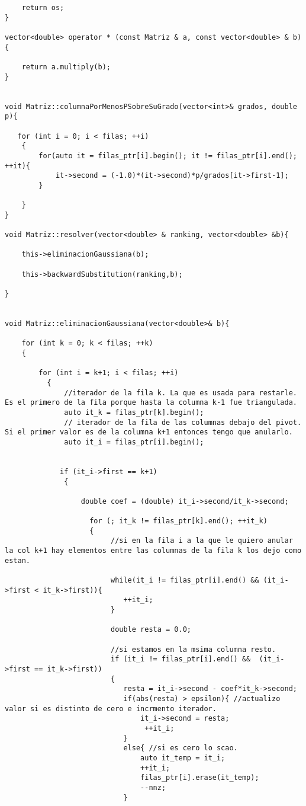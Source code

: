 \begin{lstlisting}
    return os;
}

vector<double> operator * (const Matriz & a, const vector<double> & b) {

    return a.multiply(b);
}


void Matriz::columnaPorMenosPSobreSuGrado(vector<int>& grados, double p){

   for (int i = 0; i < filas; ++i)
    {   
        for(auto it = filas_ptr[i].begin(); it != filas_ptr[i].end(); ++it){
            it->second = (-1.0)*(it->second)*p/grados[it->first-1];
        }

    }
}

void Matriz::resolver(vector<double> & ranking, vector<double> &b){

    this->eliminacionGaussiana(b);

    this->backwardSubstitution(ranking,b);

}


void Matriz::eliminacionGaussiana(vector<double>& b){

    for (int k = 0; k < filas; ++k)
    {       

        for (int i = k+1; i < filas; ++i)
          {
              //iterador de la fila k. La que es usada para restarle. Es el primero de la fila porque hasta la columna k-1 fue triangulada.
              auto it_k = filas_ptr[k].begin();
              // iterador de la fila de las columnas debajo del pivot. Si el primer valor es de la columna k+1 entonces tengo que anularlo.
              auto it_i = filas_ptr[i].begin();


             if (it_i->first == k+1)
              {

                  double coef = (double) it_i->second/it_k->second; 

                    for (; it_k != filas_ptr[k].end(); ++it_k)
                    {
                         //si en la fila i a la que le quiero anular la col k+1 hay elementos entre las columnas de la fila k los dejo como estan.
                        
                         while(it_i != filas_ptr[i].end() && (it_i->first < it_k->first)){
                            ++it_i;
                         }

                         double resta = 0.0;

                         //si estamos en la msima columna resto.
                         if (it_i != filas_ptr[i].end() &&  (it_i->first == it_k->first))
                         {
                            resta = it_i->second - coef*it_k->second;
                            if(abs(resta) > epsilon){ //actualizo valor si es distinto de cero e incrmento iterador.
                                it_i->second = resta;
                                 ++it_i;
                            }
                            else{ //si es cero lo scao.
                                auto it_temp = it_i;
                                ++it_i;
                                filas_ptr[i].erase(it_temp);
                                --nnz;
                            }
                           

\end{lstlisting}
